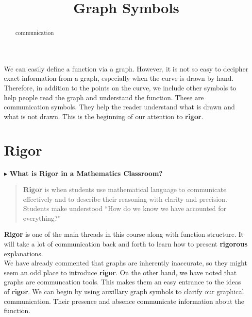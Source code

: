 \documentclass{ximera}
\title{Graph Symbols}
\begin{document}
\begin{abstract}
communication
\end{abstract}
\maketitle



We can easily define a function via a graph.  However, it is not so easy to decipher exact information from a graph, especially when the curve is drawn by hand.  Therefore, in addition to the points on the curve, we include other symbols to help people read the graph and understand the function.  These are communication symbols.  They help the reader understand what is drawn and what is not drawn.  This is the beginning of our attention to \textbf{\textcolor{purple!85!blue}{rigor}}.



\section{Rigor}

$\blacktriangleright$ \textbf{\textcolor{purple!85!blue}{What is Rigor in a Mathematics Classroom?}} \\


\begin{quote}
\textbf{\textcolor{purple!85!blue}{Rigor}} is when students use mathematical language to communicate effectively and to describe their reasoning with clarity and precision.  Students make understood ``How do we know we have accounted for everything?''
\end{quote}



\textbf{\textcolor{purple!85!blue}{Rigor}} is one of the main threads in this course along with function structure.  It will take a lot of communication back and forth to learn how to present \textbf{\textcolor{purple!85!blue}{rigorous}} explanations. \\


We have already commented that graphs are inherently inaccurate, so they might seem an odd place to introduce \textbf{\textcolor{purple!85!blue}{rigor}}.  On the other hand, we have noted that graphs are communcation tools. This makes them an easy entrance to the ideas of \textbf{\textcolor{purple!85!blue}{rigor}}.  We can begin by using auxillary graph symbols to clarify our graphical communication. Their presence and absence communicate information about the function.
\end{document}
